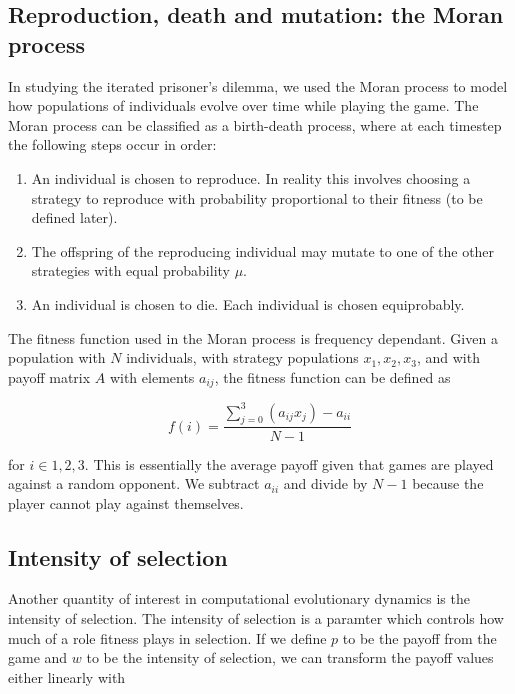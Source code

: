 \subsection{Reproduction, death and mutation: the Moran process}

In studying the iterated prisoner's dilemma, we used the Moran process to model how populations of individuals evolve over time while playing the game.
The Moran process can be classified as a birth-death process, where at each timestep the following steps occur in order:

\begin{enumerate}
    \item An individual is chosen to reproduce. In reality this involves choosing a strategy to reproduce with probability proportional to their fitness (to be defined later).
    \item The offspring of the reproducing individual may mutate to one of the other strategies with equal probability $\mu$.
    \item An individual is chosen to die. Each individual is chosen equiprobably.
\end{enumerate}

The fitness function used in the Moran process is frequency dependant.
Given a population with $N$ individuals, with strategy populations $x_1, x_2, x_3$, and with payoff matrix $A$ with elements $a_{ij}$, the fitness function can be defined as

\begin{equation*}
    f(i) = \frac{\sum_{j = 0}^3 (a_{ij} x_j) - a_{ii} }{N - 1}
\end{equation*}

for $i \in 1, 2, 3$.
This is essentially the average payoff given that games are played against a random opponent.
We subtract $a_{ii}$ and divide by $N - 1$ because the player cannot play against themselves.

\subsection{Intensity of selection}

Another quantity of interest in computational evolutionary dynamics is the intensity of selection.
The intensity of selection is a paramter which controls how much of a role fitness plays in selection.
If we define $p$ to be the payoff from the game and $w$ to be the intensity of selection, we can transform the payoff values either linearly with

